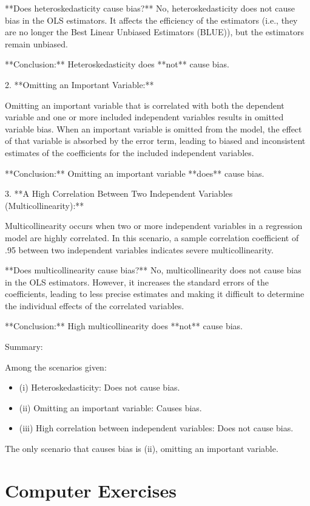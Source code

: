 \documentclass[12pt]{article}
\begin{document}
\begin{enumerate}
{**Does heteroskedasticity cause bias?** No, heteroskedasticity does not cause bias in the OLS estimators. It affects the efficiency of the estimators (i.e., they are no longer the Best Linear Unbiased Estimators (BLUE)), but the estimators remain unbiased.

**Conclusion:** Heteroskedasticity does **not** cause bias.

2. **Omitting an Important Variable:**

Omitting an important variable that is correlated with both the dependent variable and one or more included independent variables results in omitted variable bias. When an important variable is omitted from the model, the effect of that variable is absorbed by the error term, leading to biased and inconsistent estimates of the coefficients for the included independent variables.

**Conclusion:** Omitting an important variable **does** cause bias.

3. **A High Correlation Between Two Independent Variables (Multicollinearity):**

Multicollinearity occurs when two or more independent variables in a regression model are highly correlated. In this scenario, a sample correlation coefficient of .95 between two independent variables indicates severe multicollinearity.

**Does multicollinearity cause bias?** No, multicollinearity does not cause bias in the OLS estimators. However, it increases the standard errors of the coefficients, leading to less precise estimates and making it difficult to determine the individual effects of the correlated variables.

**Conclusion:** High multicollinearity does **not** cause bias.

Summary:

Among the scenarios given:
\begin{itemize}
    \item (i) Heteroskedasticity: Does not cause bias.
    \item (ii) Omitting an important variable: Causes bias.
    \item (iii) High correlation between independent variables: Does not cause bias.
\end{itemize}
The only scenario that causes bias is (ii), omitting an important variable.

}

\end{enumerate}
\section*{Computer Exercises}
\end{document}
